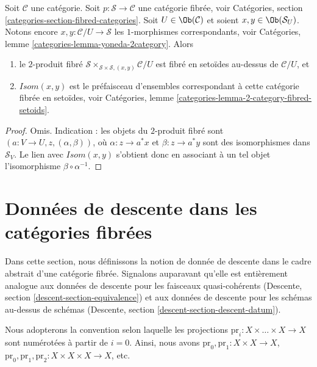 \begin{lemma}
\label{lemma-isom-as-2-fibre-product}
Soit $\mathcal{C}$ une catégorie.
Soit $p : \mathcal{S} \to \mathcal{C}$ une catégorie fibrée,
voir Catégories, section \ref{categories-section-fibred-categories}.
Soit $U \in \Ob(\mathcal{C})$ et soient $x, y \in \Ob(\mathcal{S}_U)$.
Notons encore $x, y : \mathcal{C}/U \to \mathcal{S}$ les
$1$-morphismes correspondants, voir
Catégories, lemme \ref{categories-lemma-yoneda-2category}.
Alors
\begin{enumerate}
\item le $2$-produit fibré
$\mathcal{S} \times_{\mathcal{S} \times \mathcal{S}, (x, y)} \mathcal{C}/U$
est fibré en setoïdes au-dessus de $\mathcal{C}/U$, et
\item $\mathit{Isom}(x, y)$ est le préfaisceau d'ensembles correspondant
à cette catégorie fibrée en setoïdes, voir
Catégories, lemme \ref{categories-lemma-2-category-fibred-setoids}.
\end{enumerate}
\end{lemma}

\begin{proof}
Omis. Indication : les objets du $2$-produit fibré sont
$(a : V \to U, z, (\alpha, \beta))$, où
$\alpha : z \to a^*x$ et $\beta : z \to a^*y$ sont des isomorphismes
dans $\mathcal{S}_V$. Le lien avec $\mathit{Isom}(x, y)$
s'obtient donc en associant à un tel objet l'isomorphisme
$\beta \circ \alpha^{-1}$.
\end{proof}







\section{Données de descente dans les catégories fibrées}
\label{section-descent-data}

\noindent
Dans cette section, nous définissons la notion de donnée de descente
dans le cadre abstrait d'une catégorie fibrée. Signalons auparavant qu'elle
est entièrement analogue aux données de descente pour les faisceaux
quasi-cohérents (Descente, section \ref{descent-section-equivalence})
et aux données de descente pour les schémas au-dessus de schémas
(Descente, section \ref{descent-section-descent-datum}).

\medskip\noindent
Nous adopterons la convention selon laquelle les projections
$\text{pr}_i : X \times \ldots \times X \to X$
sont numérotées à partir de $i = 0$. Ainsi, nous avons
$\text{pr}_0, \text{pr}_1 : X \times X  \to X$,
$\text{pr}_0, \text{pr}_1, \text{pr}_2 : X \times X \times X  \to X$,
etc.

